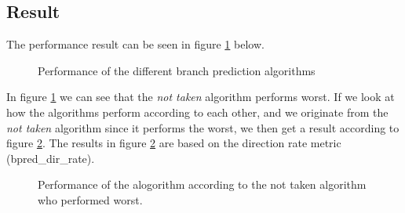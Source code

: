 \documentclass[titlepage, a4paper]{article}
\begin{document}
\subsection{Result}
The performance result can be seen in figure \ref{fig:performance} below.

\begin{figure}[H]
	\centering
	\caption{Performance of the different branch prediction algorithms}
	\label{fig:performance}
\end{figure}

In figure \ref{fig:performance} we can see that the \textit{not taken} algorithm performs worst. If we look at how the algorithms perform according to each other, and we originate from the \textit{not taken} algorithm since it performs the worst, we then get a result according to figure \ref{fig:comparative-evaluation}. The results in figure \ref{fig:comparative-evaluation} are based on the direction rate metric (bpred\_dir\_rate).

\begin{figure}[H]
	\centering
	\caption{Performance of the alogorithm according to the not taken algorithm who performed worst.}
	\label{fig:comparative-evaluation}
\end{figure}
\end{document}
